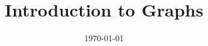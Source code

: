 \documentclass{beamer}
\title[Intro to Graphs]{Introduction to Graphs} %
\institute[BYU] %
{
Brigham Young University \\ %
\medskip
}
\date{\today} %
\begin{document}
\begin{frame}
\titlepage %
\end{frame}






\end{document}
